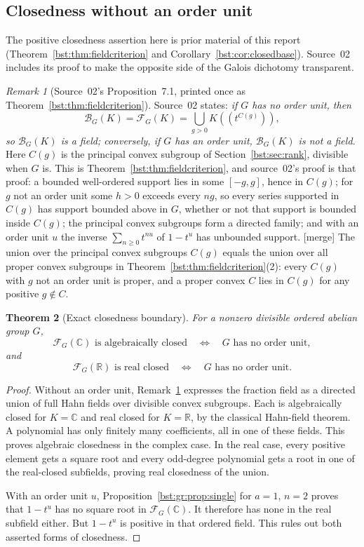 \documentclass[11pt,letterpaper]{article}
\newtheorem{theorem}{Theorem}[section]
\theoremstyle{definition}
\theoremstyle{remark}
\newtheorem{remark}[theorem]{Remark}
\newcommand{\R}{\mathbb R}
\newcommand{\C}{\mathbb C}
\newcommand{\HH}[2]{#1((t^{#2}))}
\newcommand{\BB}[2]{\mathcal B_{#2}(#1)}
\newcommand{\FF}[2]{\mathcal F_{#2}(#1)}
\begin{document}
\subsection{Closedness without an order unit}

The positive closedness assertion here is prior material of this report
(Theorem~\ref{bst:thm:fieldcriterion} and Corollary~\ref{bst:cor:closedbase}).
Source~02 includes its proof to make the opposite side of the Galois
dichotomy transparent.

\begin{remark}[Source~02's Proposition~7.1, printed once as Theorem~\ref{bst:thm:fieldcriterion}]\label{bst:gr:rem:nounit}
Source~02 states: \emph{if $G$ has no order unit, then}
\[
 \BB KG=\FF KG=\bigcup_{g>0}\HH K{C(g)},
\]
\emph{so $\BB KG$ is a field; conversely, if $G$ has an order unit, $\BB KG$ is
not a field.} Here $C(g)$ is the principal convex subgroup of
Section~\ref{bst:sec:rank}, divisible when $G$ is. This is
Theorem~\ref{bst:thm:fieldcriterion}, and source~02's proof is that proof:
a bounded well-ordered support lies in some $[-g,g]$, hence in $C(g)$; for
$g$ not an order unit some $h>0$ exceeds every $ng$, so every series supported
in $C(g)$ has support bounded above in $G$, whether or not that support is
bounded inside $C(g)$; the principal convex subgroups form a directed family;
and with an order unit $u$ the inverse $\sum_{n\ge0}t^{nu}$ of $1-t^u$ has
unbounded support. \textup{[merge]} The union over the principal convex
subgroups $C(g)$ equals the union over all proper convex subgroups in
Theorem~\ref{bst:thm:fieldcriterion}(2): every $C(g)$ with $g$ not an order
unit is proper, and a proper convex $C$ lies in $C(g)$ for any positive
$g\notin C$.
\end{remark}

\begin{theorem}[Exact closedness boundary]\label{bst:gr:thm:closedness}
For a nonzero divisible ordered abelian group $G$,
\[
 \FF{\C}G\text{ is algebraically closed}
 \quad\Longleftrightarrow\quad
 G\text{ has no order unit},
\]
and
\[
 \FF{\R}G\text{ is real closed}
 \quad\Longleftrightarrow\quad
 G\text{ has no order unit}.
\]
\end{theorem}
\begin{proof}
Without an order unit, Remark~\ref{bst:gr:rem:nounit} expresses the fraction
field as a directed union of full Hahn fields over divisible convex
subgroups. Each is algebraically closed for $K=\C$ and real closed for
$K=\R$, by the classical Hahn-field theorem. A polynomial has only finitely
many coefficients, all in one of these fields. This proves algebraic
closedness in the complex case. In the real case, every positive element
gets a square root and every odd-degree polynomial gets a root in one of the
real-closed subfields, proving real closedness of the union.

With an order unit $u$, Proposition~\ref{bst:gr:prop:single} for $a=1$, $n=2$
proves that $1-t^u$ has no square root in $\FF{\C}G$. It therefore has none
in the real subfield either. But $1-t^u$ is positive in that ordered field.
This rules out both asserted forms of closedness.
\end{proof}
\end{document}
